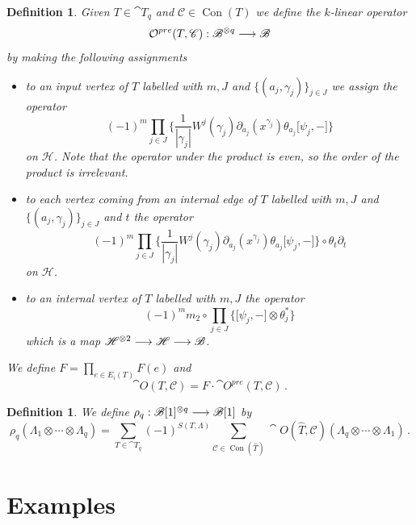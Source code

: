 \documentclass[english,letter paper,12pt,leqno]{article}
\theoremstyle{example}
\newtheorem{definition}[theorem]{Definition}
\numberwithin{equation}{section}
\def\be{\begin{equation}}
\def\ee{\end{equation}}
\begin{document}
\begin{definition} Given $T \in \cat{T}_q$ and $\mathscr{C} \in \operatorname{Con}(T)$ we define the $k$-linear operator
\[
\mathcal{O}^{pre}(T, \mathscr{C}): \mathscr{B}^{\otimes q} \longrightarrow \mathscr{B}
\]
by making the following assignments
\begin{itemize}
\item to an input vertex of $T$ labelled with $m, J$ and $\{ (a_j, \gamma_j) \}_{j \in J}$ we assign the operator
\[
(-1)^m \prod_{j \in J}\Big\{ \frac{1}{|\gamma_j|} W^j( \gamma_j) \partial_{a_j}( x^{\gamma_j} ) \theta_{a_j} \big[ \psi_j, - \big] \Big\}
\]
on $\mathscr{H}$. Note that the operator under the product is even, so the order of the product is irrelevant.
\item to each vertex coming from an internal edge of $T$ labelled with $m,J$ and $\{ (a_j, \gamma_j) \}_{j \in J}$ and $t$ the operator
\be
(-1)^m \prod_{j \in J} \Big\{ \frac{1}{|\gamma_j|} W^j( \gamma_j) \partial_{a_j}( x^{\gamma_j} ) \theta_{a_j} \big[ \psi_j, - \big] \Big\} \circ \theta_t \partial_t
\ee
on $\mathscr{H}$.
\item to an internal vertex of $T$ labelled with $m,J$ the operator
\be
(-1)^m m_2 \circ \prod_{j \in J} \Big\{ \big[ \psi_j, - \big] \otimes \theta_j^* \Big\}
\ee
which is a map $\mathscr{H}^{\otimes 2} \longrightarrow \mathscr{H} \longrightarrow \mathscr{B}$.
\end{itemize}
We define $F = \prod_{e \in E_i(T)} F(e)$ and
\[
\cat{O}(T, \mathscr{C}) = F \cdot \cat{O}^{pre}(T, \mathscr{C})\,.
\]
\end{definition}

\begin{definition} We define $\rho_q: \mathscr{B}[1]^{\otimes q} \longrightarrow \mathscr{B}[1]$ by
\[
\rho_q( \Lambda_1 \otimes \cdots \otimes \Lambda_q ) = \sum_{T \in \cat{T}_q} (-1)^{S(T, \Lambda)} \sum_{\mathscr{C} \in \operatorname{Con}(\widehat{T})} \cat{O}(\widehat{T}, \mathscr{C})( \Lambda_q \otimes \cdots \otimes \Lambda_1 )\,.
\]
\end{definition}

\section{Examples}
\end{document}
